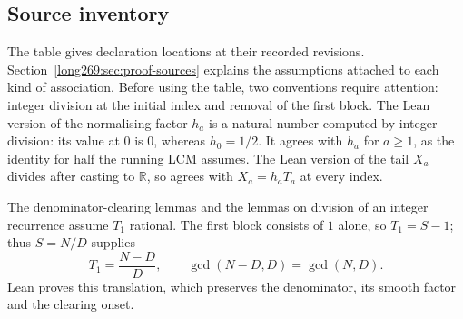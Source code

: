 \documentclass[11pt]{article}
\theoremstyle{remark}
\theoremstyle{plain}
\begin{document}
\subsection{Source inventory}\label{long269:long:sources}

The table gives declaration locations at their recorded revisions.
Section~\ref{long269:sec:proof-sources} explains the assumptions attached
to each kind of association. Before using the table, two conventions
require attention: integer division at the initial index and removal of
the first block. The Lean version of
the normalising factor $h_a$ is a natural number computed by integer division:
its value at $0$ is $0$, whereas $h_0=1/2$.  It agrees with $h_a$ for
$a\ge1$, as the identity for half the running LCM assumes.  The Lean version of the
tail $X_a$ divides after casting to $\mathbb R$, so agrees with
$X_a=h_aT_a$ at every index.

The denominator-clearing lemmas and the lemmas on division of an integer recurrence assume $T_1$ rational.
The first block consists of $1$ alone, so $T_1=S-1$; thus $S=N/D$ supplies
\[
 T_1=\frac{N-D}{D},\qquad \gcd(N-D,D)=\gcd(N,D).
\]
Lean proves this translation, which preserves the denominator, its
smooth factor and the clearing onset.
\end{document}

